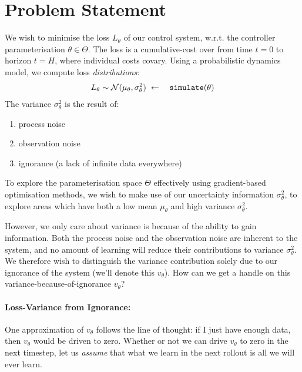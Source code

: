 \documentclass[a4paper,10pt]{article}
\newcommand{\N}{\mathcal{N}}
\begin{document}
\section{Problem Statement}

We wish to minimise the loss $L_\theta$
of our control system,
w.r.t. the controller parameterisation $\theta \in \Theta$.
The loss is a cumulative-cost over from time $t=0$ to horizon $t=H$, where individual costs covary.
Using a probabilistic dynamics model, we compute loss \emph{distributions}:
\begin{eqnarray}
 L_\theta \sim \N(\mu_\theta,\sigma^2_\theta)&\;\leftarrow\;&{\tt simulate}(\theta)
\end{eqnarray}
The variance $\sigma^2_\theta$ is the result of:
\begin{enumerate}
 \item process noise
 \item observation noise
 \item ignorance (a lack of infinite data everywhere)
\end{enumerate}
To explore the parameterisation space $\Theta$ effectively using gradient-based optimisation methods,
we wish to make use of our uncertainty information $\sigma^2_\theta$,
to explore areas which have both a low mean $\mu_\theta$ and high variance $\sigma^2_\theta$.

\medskip

However, we only care about variance is because of the ability to gain information.
Both the process noise and the observation noise are inherent to the system, and no amount of learning
will reduce their contributions to variance $\sigma^2_\theta$.
We therefore wish to distinguish the variance contribution solely due to our ignorance of the system
(we'll denote this $v_\theta$).
How can we get a handle on this variance-because-of-ignorance $v_\theta$?

\paragraph{Loss-Variance from Ignorance:}\label{sec:handles}

One approximation of $v_\theta$ follows the line of thought:
if I just have enough data, then $v_\theta$ would be driven to zero.
Whether or not we can drive $v_\theta$ to zero in the next timestep,
let us \textit{assume} that what we learn in the next rollout is all we will ever learn.
\end{document}
